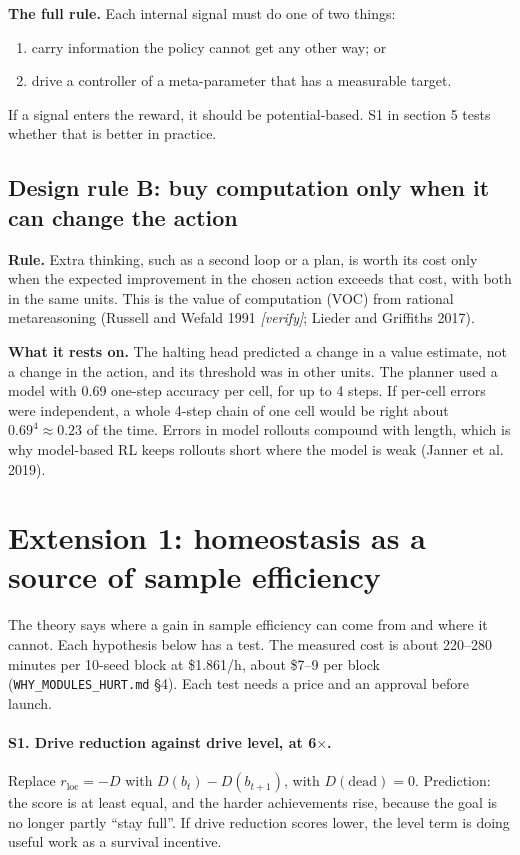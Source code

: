 \documentclass[11pt]{article}
\begin{document}
\textbf{The full rule.} Each internal signal must do one of two things:

\begin{enumerate}
\item carry information the policy cannot get any other way; or
\item drive a controller of a meta-parameter that has a measurable target.
\end{enumerate}

If a signal enters the reward, it should be potential-based. S1 in section 5 tests whether that is better in practice.

\subsection{Design rule B: buy computation only when it can change the action}

\textbf{Rule.} Extra thinking, such as a second loop or a plan, is worth its cost only when the expected improvement in the chosen action exceeds that cost, with both in the same units. This is the value of computation (VOC) from rational metareasoning (Russell and Wefald 1991 \textit{[verify]}; Lieder and Griffiths 2017).

\textbf{What it rests on.} The halting head predicted a change in a value estimate, not a change in the action, and its threshold was in other units. The planner used a model with 0.69 one-step accuracy per cell, for up to 4 steps. If per-cell errors were independent, a whole 4-step chain of one cell would be right about $0.69^4 \approx 0.23$ of the time. Errors in model rollouts compound with length, which is why model-based RL keeps rollouts short where the model is weak (Janner et al. 2019).

\section{Extension 1: homeostasis as a source of sample efficiency}

The theory says where a gain in sample efficiency can come from and where it cannot. Each hypothesis below has a test. The measured cost is about 220--280 minutes per 10-seed block at \$1.861/h, about \$7--9 per block (\texttt{WHY\_MODULES\_HURT.md} §4). Each test needs a price and an approval before launch.

\paragraph{S1. Drive reduction against drive level, at 6$\times$.}
Replace $r_{\text{loc}} = -D$ with $D(b_t) - D(b_{t+1})$, with $D(\text{dead}) = 0$. Prediction: the score is at least equal, and the harder achievements rise, because the goal is no longer partly ``stay full''. If drive reduction scores lower, the level term is doing useful work as a survival incentive.
\end{document}
